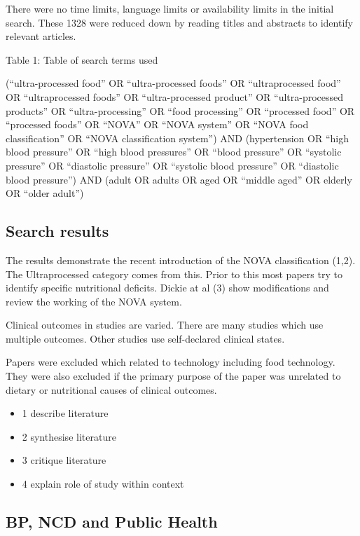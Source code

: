 \documentclass[
]{article}
\providecommand{\tightlist}{%
  \setlength{\itemsep}{0pt}\setlength{\parskip}{0pt}}
\begin{document}
There were no time limits, language limits or availability limits in the
initial search. These 1328 were reduced down by reading titles and
abstracts to identify relevant articles.

Table 1: Table of search terms used

(``ultra-processed food'' OR ``ultra-processed foods'' OR
``ultraprocessed food'' OR ``ultraprocessed foods'' OR ``ultra-processed
product'' OR ``ultra-processed products'' OR ``ultra-processing'' OR
``food processing'' OR ``processed food'' OR ``processed foods'' OR
``NOVA'' OR ``NOVA system'' OR ``NOVA food classification'' OR ``NOVA
classification system'') AND (hypertension OR ``high blood pressure'' OR
``high blood pressures'' OR ``blood pressure'' OR ``systolic pressure''
OR ``diastolic pressure'' OR ``systolic blood pressure'' OR ``diastolic
blood pressure'') AND (adult OR adults OR aged OR ``middle aged'' OR
elderly OR ``older adult'')

\hypertarget{search-results}{%
\subsection{Search results}\label{search-results}}

The results demonstrate the recent introduction of the NOVA
classification (1,2). The Ultraprocessed category comes from this. Prior
to this most papers try to identify specific nutritional deficits.
Dickie at al (3) show modifications and review the working of the NOVA
system.

Clinical outcomes in studies are varied. There are many studies which
use multiple outcomes. Other studies use self-declared clinical states.

Papers were excluded which related to technology including food
technology. They were also excluded if the primary purpose of the paper
was unrelated to dietary or nutritional causes of clinical outcomes.

\begin{itemize}
\tightlist
\item
  1 describe literature
\item
  2 synthesise literature
\item
  3 critique literature
\item
  4 explain role of study within context
\end{itemize}

\hypertarget{bp-ncd-and-public-health}{%
\subsection{BP, NCD and Public Health~}\label{bp-ncd-and-public-health}}
\end{document}
